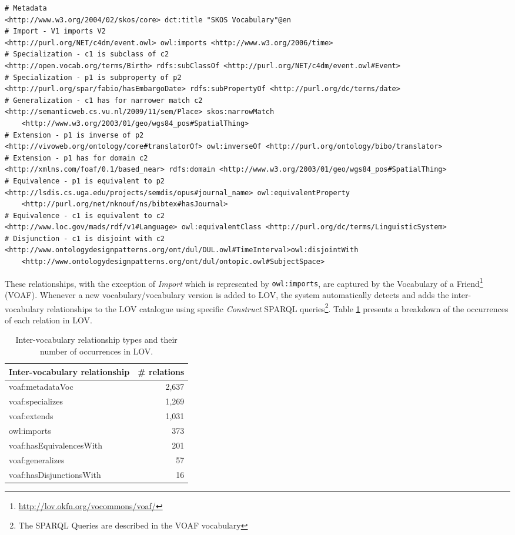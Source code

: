 \documentclass{iosart2c}
\begin{document}
\begin{lstlisting}[float=*,basicstyle=\tiny,label={list:voaf}, language=turtle, caption={Examples of Inter-vocabulary relationships.}]
# Metadata
<http://www.w3.org/2004/02/skos/core> dct:title "SKOS Vocabulary"@en
# Import - V1 imports V2
<http://purl.org/NET/c4dm/event.owl> owl:imports <http://www.w3.org/2006/time>
# Specialization - c1 is subclass of c2
<http://open.vocab.org/terms/Birth> rdfs:subClassOf <http://purl.org/NET/c4dm/event.owl#Event>
# Specialization - p1 is subproperty of p2  
<http://purl.org/spar/fabio/hasEmbargoDate> rdfs:subPropertyOf <http://purl.org/dc/terms/date>
# Generalization - c1 has for narrower match c2 
<http://semanticweb.cs.vu.nl/2009/11/sem/Place> skos:narrowMatch 
    <http://www.w3.org/2003/01/geo/wgs84_pos#SpatialThing>
# Extension - p1 is inverse of p2
<http://vivoweb.org/ontology/core#translatorOf> owl:inverseOf <http://purl.org/ontology/bibo/translator>
# Extension - p1 has for domain c2
<http://xmlns.com/foaf/0.1/based_near> rdfs:domain <http://www.w3.org/2003/01/geo/wgs84_pos#SpatialThing>
# Equivalence - p1 is equivalent to p2
<http://lsdis.cs.uga.edu/projects/semdis/opus#journal_name> owl:equivalentProperty 
    <http://purl.org/net/nknouf/ns/bibtex#hasJournal>
# Equivalence - c1 is equivalent to c2 
<http://www.loc.gov/mads/rdf/v1#Language> owl:equivalentClass <http://purl.org/dc/terms/LinguisticSystem>
# Disjunction - c1 is disjoint with c2
<http://www.ontologydesignpatterns.org/ont/dul/DUL.owl#TimeInterval>owl:disjointWith 
    <http://www.ontologydesignpatterns.org/ont/dul/ontopic.owl#SubjectSpace>
\end{lstlisting}

These relationships, with the exception of \emph{Import} which is represented by {\small\texttt{owl:imports}}, are captured by the Vocabulary of a Friend\footnote{\url{http://lov.okfn.org/vocommons/voaf/}} (VOAF). Whenever a new vocabulary/vocabulary version is added to LOV, the system automatically detects and adds the inter-vocabulary relationships to the LOV catalogue using specific \emph{Construct} SPARQL queries\footnote{The SPARQL Queries are described in the VOAF vocabulary}. Table \ref{tab:voaf} presents a breakdown of the occurrences of each relation in LOV.

\begin{table}[h!tb]
\caption{Inter-vocabulary relationship types and their number of occurrences in LOV.}
\begin{tabular}{lr}
\hline
\textbf{Inter-vocabulary relationship} & \textbf{\# relations} \\ \hline
voaf:metadataVoc & 2,637 \\
voaf:specializes & 1,269 \\
voaf:extends & 1,031 \\
owl:imports & 373 \\
voaf:hasEquivalencesWith & 201 \\
voaf:generalizes & 57 \\
voaf:hasDisjunctionsWith & 16 \\
\hline  
\end{tabular}
\label{tab:voaf}
\end{table}
\end{document}
